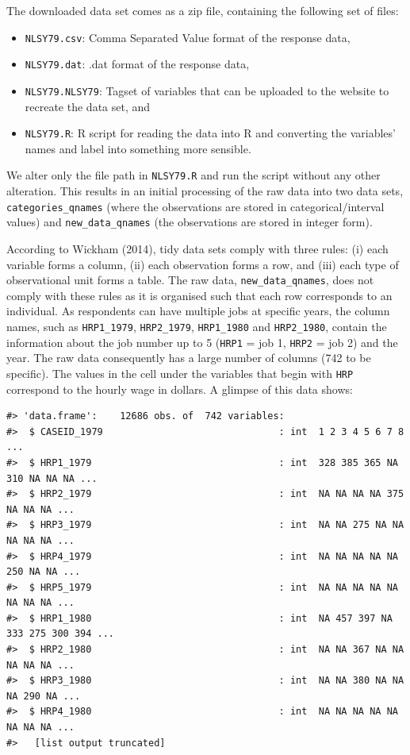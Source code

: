 \documentclass{article}
\begin{document}
The downloaded data set comes as a zip file, containing the following set of files:

\begin{itemize}
\tightlist
\item
  \texttt{NLSY79.csv}: Comma Separated Value format of the response data,
\item
  \texttt{NLSY79.dat}: .dat format of the response data,
\item
  \texttt{NLSY79.NLSY79}: Tagset of variables that can be uploaded to the website to recreate the data set, and
\item
  \texttt{NLSY79.R}: R script for reading the data into R and converting the variables' names and label into something more sensible.
\end{itemize}

We alter only the file path in \texttt{NLSY79.R} and run the script without any other alteration. This results in an initial processing of the raw data into two data sets, \texttt{categories\_qnames} (where the observations are stored in categorical/interval values) and \texttt{new\_data\_qnames} (the observations are stored in integer form).

According to Wickham (2014), tidy data sets comply with three rules: (i) each variable forms a column, (ii) each observation forms a row, and (iii) each type of observational unit forms a table. The raw data, \texttt{new\_data\_qnames}, does not comply with these rules as it is organised such that each row corresponds to an individual. As respondents can have multiple jobs at specific years, the column names, such as \texttt{HRP1\_1979}, \texttt{HRP2\_1979}, \texttt{HRP1\_1980} and \texttt{HRP2\_1980}, contain the information about the job number up to 5 (\texttt{HRP1} = job 1, \texttt{HRP2} = job 2) and the year. The raw data consequently has a large number of columns (742 to be specific). The values in the cell under the variables that begin with \texttt{HRP} correspond to the hourly wage in dollars. A glimpse of this data shows:

\begin{verbatim}
#> 'data.frame':    12686 obs. of  742 variables:
#>  $ CASEID_1979                               : int  1 2 3 4 5 6 7 8 ...
#>  $ HRP1_1979                                 : int  328 385 365 NA 310 NA NA NA ...
#>  $ HRP2_1979                                 : int  NA NA NA NA 375 NA NA NA ...
#>  $ HRP3_1979                                 : int  NA NA 275 NA NA NA NA NA ...
#>  $ HRP4_1979                                 : int  NA NA NA NA NA 250 NA NA ...
#>  $ HRP5_1979                                 : int  NA NA NA NA NA NA NA NA ...
#>  $ HRP1_1980                                 : int  NA 457 397 NA 333 275 300 394 ...
#>  $ HRP2_1980                                 : int  NA NA 367 NA NA NA NA NA ...
#>  $ HRP3_1980                                 : int  NA NA 380 NA NA NA 290 NA ...
#>  $ HRP4_1980                                 : int  NA NA NA NA NA NA NA NA ...
#>   [list output truncated]
\end{verbatim}
\end{document}
